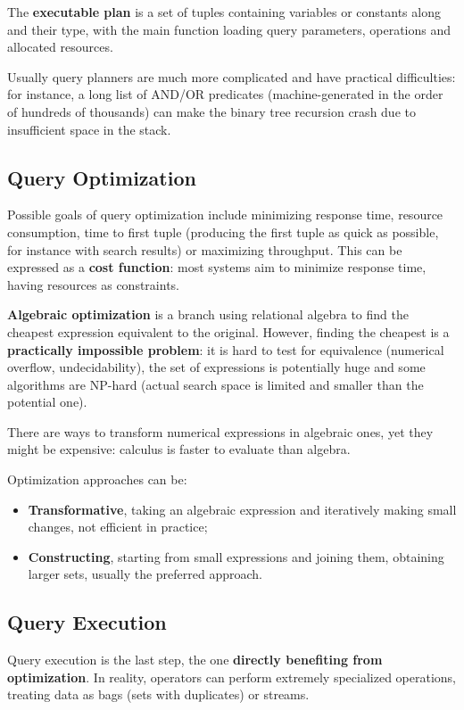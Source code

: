 The \textbf{executable plan} is a set of tuples containing variables or constants along and their type, with the main function loading query parameters, operations and allocated resources. 

Usually query planners are much more complicated and have practical difficulties: for instance, a long list of AND/OR predicates (machine-generated in the order of hundreds of thousands) can make the binary tree recursion crash due to insufficient space in the stack.

\subsection{Query Optimization}
Possible goals of query optimization include minimizing response time, resource consumption, time to first tuple (producing the first tuple as quick as possible, for instance with search results) or maximizing throughput. This can be expressed as a \textbf{cost function}: most systems aim to minimize response time, having resources as constraints.

\textbf{Algebraic optimization} is a branch using relational algebra to find the cheapest expression equivalent to the original. However, finding the cheapest is a \textbf{practically impossible problem}: it is hard to test for equivalence (numerical overflow, undecidability), the set of expressions is potentially huge and some algorithms are NP-hard (actual search space is limited and smaller than the potential one). 

There are ways to transform numerical expressions in algebraic ones, yet they might be expensive: calculus is faster to evaluate than algebra. 

Optimization approaches can be:
\begin{itemize}
	\item \textbf{Transformative}, taking an algebraic expression and iteratively making small changes, not efficient in practice;
	\item \textbf{Constructing}, starting from small expressions and joining them, obtaining larger sets, usually the preferred approach.
\end{itemize}

\subsection{Query Execution}
Query execution is the last step, the one \textbf{directly benefiting from optimization}. In reality, operators can perform extremely specialized operations, treating data as bags (sets with duplicates) or streams.

